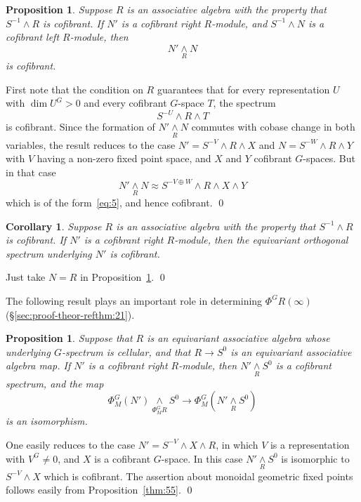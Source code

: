 \documentclass{amsart}
\newtheorem{cor}[equation]{Corollary}
\newtheorem{prop}[equation]{Proposition}
\theoremstyle{definition}
\theoremstyle{remark}
\newenvironment{pf}{\bigskip{\em Proof:\/}}{\qed\medskip}
\newcommand{\smashove}[1]{\underset{#1}{\wedge}}
\newcommand{\gfp}[1]{\Phi^{#1}}
\newcommand{\gfpm}[1]{\Phi_{M}^{#1}}
\newcommand{\phig}{\gfp{G}}
\newcommand{\phigm}{\gfpm{G}}
\newcommand{\fixg}[1]{#1^{G}}
\begin{document}
\begin{prop}
\label{thm:190} Suppose $R$ is an associative algebra with the
property that $S^{-1}\wedge R$ is cofibrant.  If $N'$ is a cofibrant
right $R$-module, and $S^{-1}\wedge N$ is a cofibrant left $R$-module,
then
\[
N'\smashove{R}N
\]
is cofibrant.
\end{prop}

\begin{pf}
First note that the condition on $R$ guarantees that for every
representation $U$ with $\dim U^{G}>0$ and every cofibrant $G$-space
$T$, the spectrum
\begin{equation}
\label{eq:5}
S^{-U}\wedge R \wedge T
\end{equation}
is cofibrant.  Since the formation of $N'\smashove{R}N$ commutes with
cobase change in both variables, the result reduces to the case
$N'=S^{-V}\wedge R\wedge X$ and $N=S^{-W}\wedge R\wedge Y$ with $V$
having a non-zero fixed point space, and $X$ and $Y$ cofibrant
$G$-spaces.  But in that case
\[
N'\smashove{R}N \approx S^{-V\oplus W}\wedge R\wedge X\wedge Y
\]
which is of the form~\eqref{eq:5}, and hence cofibrant.
\end{pf}


\begin{cor}
\label{thm:57}
Suppose $R$ is an associative algebra with the property that
$S^{-1}\wedge R$ is cofibrant.  If $N'$ is a cofibrant right
$R$-module, then the equivariant orthogonal spectrum underlying $N'$ is cofibrant.
\end{cor}

\begin{pf}
Just take $N=R$ in Proposition~\ref{thm:190}.
\end{pf}


The following result plays an important role in determining $\phig
R(\infty)$ (\S\ref{sec:proof-theor-refthm:21}).

\begin{prop}
\label{thm:191} 
Suppose that $R$ is an equivariant associative algebra
whose underlying $G$-spectrum is cellular, and that $R\to S^{0}$ is an
equivariant associative algebra map.  If $N'$ is a cofibrant right
$R$-module, then $N'\smashove{R}S^{0}$ is a cofibrant spectrum, and
the map
\[
\phigm(N')\smashove{\phigm R} S^{0} \to \phigm (N'\smashove{R}S^{0})
\]
is an isomorphism.
\end{prop}

\begin{pf}
One easily reduces to the case $N'=S^{-V}\wedge X\wedge R$, in which
$V$ is a representation with $\fixg{V}\ne 0$, and $X$ is a cofibrant
$G$-space.  In this case $N'\smashove{R}S^{0}$ is isomorphic to
$S^{-V}\wedge X$ which is cofibrant.  The assertion about monoidal
geometric fixed points follows easily from Proposition~\ref{thm:55}.
\end{pf}
\end{document}
